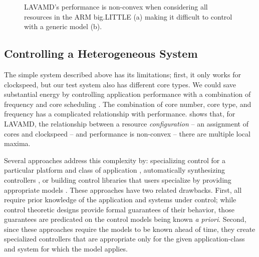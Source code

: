\begin{figure}
  \subfloat[]
  {
    
    \label{fig:lavamd_control2}
  }
  \caption{LAVAMD's performance is non-convex when considering all
    resources in the ARM big.LITTLE (a) making it difficult to control
    with a generic model (b).}
 \label{fig:learning-models}
\end{figure}


\subsection{Controlling a Heterogeneous System}
The simple system described above has its limitations; first, it only
works for clockspeed, but our test system also has different core
types.  We could save substantial energy by controlling application
performance with a combination of frequency and core scheduling
\cite{Carroll2013,kim-cpsna}.  The combination of core number, core
type, and frequency has a complicated relationship with performance.
 shows that, for LAVAMD, the relationship
between a resource \emph{configuration} -- \ie{} an assignment of
cores and clockspeed -- and performance is non-convex -- \ie{} there
are multiple local maxima.


Several approaches address this complexity by: specializing control
for a particular platform and class of application
\cite{grace,Agilos,METE}, automatically synthesizing controllers
\cite{josep-isca2016,FSE2015}, or building control libraries that
users specialize by providing appropriate models
\cite{POET,ControlWare,SWiFT}. These approaches have two related
drawbacks.  First, all require prior knowledge of the application and
systems under control; while control theoretic designs provide formal
guarantees of their behavior, those guarantees are predicated on the
control models being known {\em a priori}. Second, since these
approaches require the models to be known ahead of time, they create
specialized controllers that are appropriate only for the given
application-class and system for which the model applies.

